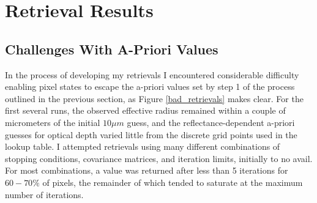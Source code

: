 \documentclass[12pt]{article}
\begin{document}
\section{Retrieval Results}

\subsection{Challenges With A-Priori Values}

In the process of developing my retrievals I encountered considerable difficulty enabling pixel states to escape the a-priori values set by step 1 of the process outlined in the previous section, as Figure \ref{bad_retrievals} makes clear. For the first several runs, the observed effective radius remained within a couple of micrometers of the initial $10\mu m$ guess, and the reflectance-dependent a-priori guesses for optical depth varied little from the discrete grid points used in the lookup table. I attempted retrievals using many different combinations of stopping conditions, covariance matrices, and iteration limits, initially to no avail. For most combinations, a value was returned after less than 5 iterations for $60-70\%$ of pixels, the remainder of which tended to saturate at the maximum number of iterations.
\end{document}
